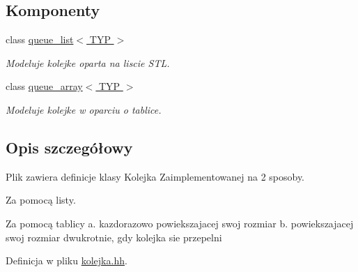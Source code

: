 \subsection*{Komponenty}
\begin{DoxyCompactItemize}
\item 
class \hyperlink{classqueue__list}{queue\-\_\-list$<$ T\-Y\-P $>$}
\begin{DoxyCompactList}\small\item\em Modeluje kolejke oparta na liscie S\-T\-L. \end{DoxyCompactList}\item 
class \hyperlink{classqueue__array}{queue\-\_\-array$<$ T\-Y\-P $>$}
\begin{DoxyCompactList}\small\item\em Modeluje kolejke w oparciu o tablice. \end{DoxyCompactList}\end{DoxyCompactItemize}


\subsection{Opis szczegółowy}
Plik zawiera definicje klasy Kolejka Zaimplementowanej na 2 sposoby. 
\begin{DoxyEnumerate}
\item Za pomocą listy.
\item Za pomocą tablicy a. kazdorazowo powiekszajacej swoj rozmiar b. powiekszajacej swoj rozmiar dwukrotnie, gdy kolejka sie przepelni 
\end{DoxyEnumerate}

Definicja w pliku \hyperlink{kolejka_8hh_source}{kolejka.\-hh}.

